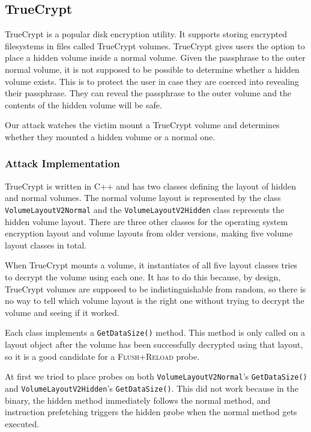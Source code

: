 \documentclass{acm_proc_article-sp}
\begin{document}
\subsection{TrueCrypt}

TrueCrypt is a popular disk encryption utility. It supports storing encrypted
filesystems in files called TrueCrypt volumes. TrueCrypt gives users the option
to place a hidden volume inside a normal volume. Given the passphrase to the
outer normal volume, it is not supposed to be possible to determine whether
a hidden volume exists. This is to protect the user in case they are coerced
into revealing their passphrase. They can reveal the passphrase to the outer
volume and the contents of the hidden volume will be safe. 

Our attack watches the victim mount a TrueCrypt volume and determines whether
they mounted a hidden volume or a normal one.

\subsubsection{Attack Implementation}

TrueCrypt is written in C++ and has two classes defining the layout of hidden
and normal volumes. The normal volume layout is represented by the class
\texttt{VolumeLayoutV2Normal} and the \texttt{VolumeLayoutV2Hidden} class
represents the hidden volume layout. There are three other classes for the
operating system encryption layout and volume layouts from older versions,
making five volume layout classes in total.

When TrueCrypt mounts a volume, it instantiates of all five layout classes tries
to decrypt the volume using each one. It has to do this because, by design,
TrueCrypt volumes are supposed to be indistinguishable from random, so there is
no way to tell which volume layout is the right one without trying to decrypt
the volume and seeing if it worked.

Each class implements a \texttt{GetDataSize()} method. This method is only
called on a layout object after the volume has been successfully decrypted using
that layout, so it is a good candidate for a \textsc{Flush+Reload} probe.

At first we tried to place probes on both \texttt{VolumeLayoutV2Normal}'s
\texttt{GetDataSize()} and \texttt{VolumeLayoutV2Hidden}'s
\texttt{GetDataSize()}. This did not work because in the binary, the hidden
method immediately follows the normal method, and instruction prefetching
triggers the hidden probe when the normal method gets executed.
\end{document}

